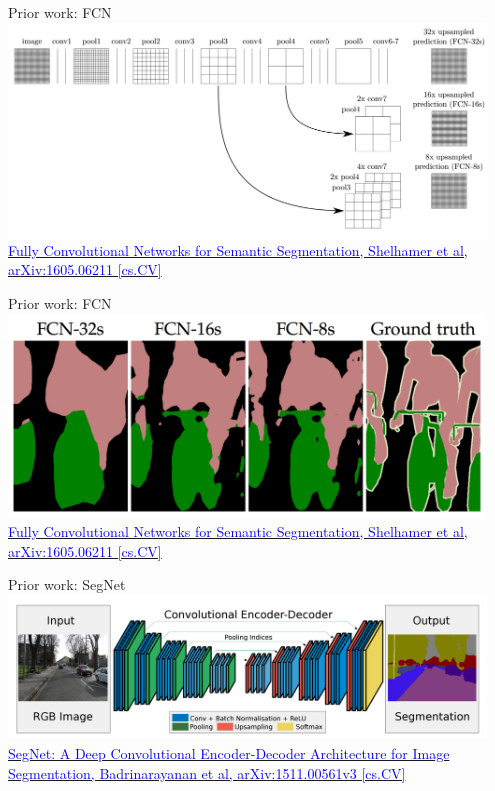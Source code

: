 \documentclass[]{beamer}
\begin{document}
\begin{frame}{Prior work: FCN}
\centering
\includegraphics[width=0.95\textwidth]{figures/fcn-2} \\
\href{https://arxiv.org/abs/1605.06211}{\textcolor{blue}{Fully Convolutional Networks for Semantic Segmentation, Shelhamer et al, arXiv:1605.06211 [cs.CV]}}
\end{frame}

\begin{frame}{Prior work: FCN}
\centering
\includegraphics[width=0.95\textwidth]{figures/fcn-3} \\
\href{https://arxiv.org/abs/1605.06211}{\textcolor{blue}{Fully Convolutional Networks for Semantic Segmentation, Shelhamer et al, arXiv:1605.06211 [cs.CV]}}
\end{frame}

\begin{frame}{Prior work: SegNet}
\centering
\includegraphics[width=0.95\textwidth]{figures/segnet} \\
\href{https://arxiv.org/abs/1511.00561}{\textcolor{blue}{
SegNet: A Deep Convolutional Encoder-Decoder Architecture for Image Segmentation, Badrinarayanan et al, arXiv:1511.00561v3 [cs.CV]}}
\end{frame}
\end{document}
